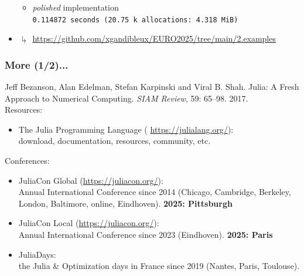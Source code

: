 \documentclass[]{beamer}
\newcommand*{\blue}[1]{\textcolor{nblue}{#1}}
\begin{document}
\begin{frame}
\begin{itemize}
\begin{itemize}
\item[] \hspace{-7.85mm} \textit{polished} implementation \\
{\scriptsize
\hspace{-7.5mm}\texttt{0.114872 seconds (20.75 k allocations: 4.318 MiB)} %
}
\end{itemize}
\vspace{3mm}
\item[] \hspace{-3.5mm}$\drsh$ \tiny{\url{https://github.com/xgandibleux/EURO2025/tree/main/2.examples}}

\end{itemize}



\end{frame}

% 
%

\begin{frame}
  \frametitle{More (1/2)...}
\vspace{3mm}

{\footnotesize

Jeff Bezanson, Alan Edelman, Stefan Karpinski and Viral B. Shah.
Julia: A Fresh Approach to Numerical Computing. 
\textit{SIAM Review}, 59: 65--98. 2017.\vspace{5mm}\\

Resources:\\
\begin{itemize}
\item[] \blue{The Julia Programming Language} ( \url{https://julialang.org/}): \\
download, documentation, resources, community, etc. \vspace{4mm}
\end{itemize}

Conferences:\\
\begin{itemize}
\item[] \blue{JuliaCon Global} (\url{https://juliacon.org/}):\\ Annual International Conference since 2014 (Chicago, Cambridge, Berkeley, London, Baltimore, online, Eindhoven). \textbf{2025: Pittsburgh} \vspace{1.5mm}

\item[] \blue{JuliaCon Local} (\url{https://juliacon.org/}):\\ Annual International Conference since 2023 (Eindhoven). \textbf{2025: Paris} \vspace{1.5mm}\\

\item[] \blue{JuliaDays}:\\ the Julia \& Optimization days in France since 2019 (Nantes, Paris, Toulouse).
\end{itemize}

}
\end{frame}
\end{document}
